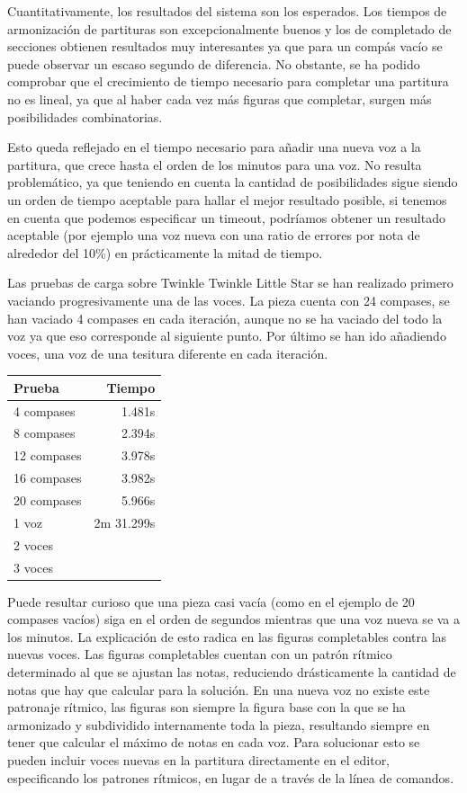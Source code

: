 Cuantitativamente, los resultados del sistema son los esperados. Los tiempos de armonización de partituras son excepcionalmente buenos y los de completado de secciones obtienen resultados muy interesantes ya que para un compás vacío se puede observar un escaso segundo de diferencia. No obstante, se ha podido comprobar que el crecimiento de tiempo necesario para completar una partitura no es lineal, ya que al haber cada vez más figuras que completar, surgen más posibilidades combinatorias.

Esto queda reflejado en el tiempo necesario para añadir una nueva voz a la partitura, que crece hasta el orden de los minutos para una voz. No resulta problemático, ya que teniendo en cuenta la cantidad de posibilidades sigue siendo un orden de tiempo aceptable para hallar el mejor resultado posible, si tenemos en cuenta que podemos especificar un timeout, podríamos obtener un resultado aceptable (por ejemplo una voz nueva con una ratio de errores por nota de alrededor del 10\%) en prácticamente la mitad de tiempo.

Las pruebas de carga sobre Twinkle Twinkle Little Star se han realizado primero vaciando progresivamente una de las voces. La pieza cuenta con 24 compases, se han vaciado 4 compases en cada iteración, aunque no se ha vaciado del todo la voz ya que eso corresponde al siguiente punto. Por último se han ido añadiendo voces, una voz de una tesitura diferente en cada iteración.
\begin{center}
	\begin{tabular}{ | l | r | }
		\hline
		Prueba & Tiempo \\ \hline
		4 compases  & 1.481s \\ \hline
		8 compases 	& 2.394s \\ \hline
		12 compases	& 3.978s \\ \hline
		16 compases & 3.982s \\ \hline
		20 compases & 5.966s \\ \hline
		1 voz & 2m 31.299s \\ \hline
		2 voces  &  \\ \hline
		3 voces  &  \\ \hline
	\end{tabular}
\end{center}

Puede resultar curioso que una pieza casi vacía (como en el ejemplo de 20 compases vacíos) siga en el orden de segundos mientras que una voz nueva se va a los minutos. La explicación de esto radica en las figuras completables contra las nuevas voces. Las figuras completables cuentan con un patrón rítmico determinado al que se ajustan las notas, reduciendo drásticamente la cantidad de notas que hay que calcular para la solución. En una nueva voz no existe este patronaje rítmico, las figuras son siempre la figura base con la que se ha armonizado y subdividido internamente toda la pieza, resultando siempre en tener que calcular el máximo de notas en cada voz. Para solucionar esto se pueden incluir voces nuevas en la partitura directamente en el editor, especificando los patrones rítmicos, en lugar de a través de la línea de comandos.
  
